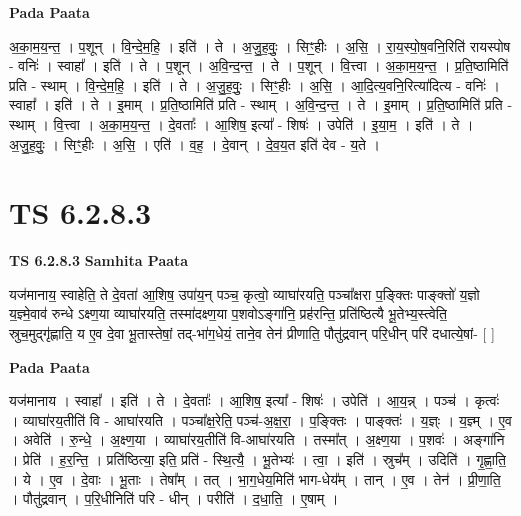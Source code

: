 \documentclass[17pt]{extarticle}
\begin{document}
\textbf{Pada Paata} \newline

अ॒का॒म॒य॒न्त॒ । प॒शून् । वि॒न्दे॒म॒हि॒ । इति॑ । ते । अ॒जु॒ह॒वुः॒ । सिꣳ॒॒हीः । अ॒सि॒ । रा॒य॒स्पो॒ष॒वनि॒रिति॑ रायस्पोष - वनिः॑ । स्वाहा᳚ । इति॑ । ते । प॒शून् । अ॒वि॒न्द॒न्त॒ । ते । प॒शून् । वि॒त्त्वा । अ॒का॒म॒य॒न्त॒ । प्र॒ति॒ष्ठामिति॑ प्रति - स्थाम् । वि॒न्दे॒म॒हि॒ । इति॑ । ते । अ॒जु॒ह॒वुः॒ । सिꣳ॒॒हीः । अ॒सि॒ । आ॒दि॒त्य॒वनि॒रित्या॑दित्य - वनिः॑ । स्वाहा᳚ । इति॑ । ते । इ॒माम् । प्र॒ति॒ष्ठामिति॑ प्रति - स्थाम् । अ॒वि॒न्द॒न्त॒ । ते । इ॒माम् । प्र॒ति॒ष्ठामिति॑ प्रति - स्थाम् । वि॒त्त्वा । अ॒का॒म॒य॒न्त॒ । दे॒वताः᳚ । आ॒शिष॒ इत्या᳚ - शिषः॑ । उपेति॑ । इ॒या॒म॒ । इति॑ । ते । अ॒जु॒ह॒वुः॒ । सिꣳ॒॒हीः । अ॒सि॒ । एति॑ । व॒ह॒ । दे॒वान् । दे॒व॒य॒त इति॑ देव - य॒ते ।  \newline





\section{ TS 6.2.8.3 }

\textbf{TS 6.2.8.3 } \newline
\textbf{Samhita Paata} \newline

यज॑मानाय॒ स्वाहेति॒ ते दे॒वता॑ आ॒शिष॒ उपा॑य॒न् पञ्च॒ कृत्वो॒ व्याघा॑रयति॒ पञ्चा᳚क्षरा प॒ङ्क्तिः पाङ्क्तो॑ य॒ज्ञो य॒ज्ञ्मे॒वाव॑ रुन्धे ऽक्ष्ण॒या व्याघा॑रयति॒ तस्मा॑दक्ष्ण॒या प॒शवोऽङ्गा॑नि॒ प्रह॑रन्ति॒ प्रति॑ष्ठित्यै भू॒तेभ्य॒स्त्वेति॒ स्रुच॒मुद्गृ॑ह्णाति॒ य ए॒व दे॒वा भू॒तास्तेषां॒ तद्-भा॑ग॒धेयं॒ ताने॒व तेन॑ प्रीणाति॒ पौतु॑द्रवान् परि॒धीन् परि॑ दधात्ये॒षां- [  ] \newline

\textbf{Pada Paata} \newline

यज॑मानाय । स्वाहा᳚ । इति॑ । ते । दे॒वताः᳚ । आ॒शिष॒ इत्या᳚ - शिषः॑ । उपेति॑ । आ॒य॒न्न् । पञ्च॑ । कृत्वः॑ । व्याघा॑रय॒तीति॑ वि - आघा॑रयति । पञ्चा᳚क्ष॒रेति॒ पञ्च॑-अ॒क्ष॒रा॒ । प॒ङ्क्तिः । पाङ्क्तः॑ । य॒ज्ञ्ः । य॒ज्ञ्म् । ए॒व । अवेति॑ । रु॒न्धे॒ । अ॒क्ष्ण॒या । व्याघा॑रय॒तीति॑ वि-आघा॑रयति । तस्मा᳚त् । अ॒क्ष्ण॒या । प॒शवः॑ । अङ्गा॑नि । प्रेति॑ । ह॒र॒न्ति॒ । प्रति॑ष्ठित्या॒ इति॒ प्रति॑ - स्थि॒त्यै॒ । भू॒तेभ्यः॑ । त्वा॒ । इति॑ । स्रुच᳚म् । उदिति॑ । गृ॒ह्णा॒ति॒ । ये । ए॒व । दे॒वाः । भू॒ताः । तेषा᳚म् । तत् । भा॒ग॒धेय॒मिति॑ भाग-धेय᳚म् । तान् । ए॒व । तेन॑ । प्री॒णा॒ति॒ । पौतु॑द्रवान् । प॒रि॒धीनिति॑ परि - धीन् । परीति॑ । द॒धा॒ति॒ । ए॒षाम् ।  \newline
\end{document}
